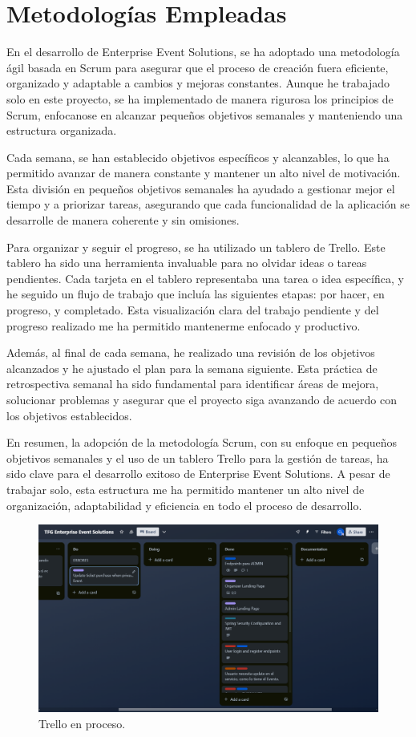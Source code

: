 \section{Metodologías Empleadas}

En el desarrollo de Enterprise Event Solutions, se ha adoptado una metodología ágil basada en Scrum para asegurar que el proceso de creación 
fuera eficiente, organizado y adaptable a cambios y mejoras constantes. Aunque he trabajado solo en este proyecto, se ha implementado de manera 
rigurosa los principios de Scrum, enfocanose en alcanzar pequeños objetivos semanales y manteniendo una estructura organizada.

Cada semana, se han establecido objetivos específicos y alcanzables, lo que ha permitido avanzar de manera constante y mantener un alto nivel 
de motivación. Esta división en pequeños objetivos semanales ha ayudado a gestionar mejor el tiempo y a priorizar tareas, asegurando que cada 
funcionalidad de la aplicación se desarrolle de manera coherente y sin omisiones.

Para organizar y seguir el progreso, se ha utilizado un tablero de Trello. Este tablero ha sido una herramienta invaluable para no olvidar ideas o 
tareas pendientes. Cada tarjeta en el tablero representaba una tarea o idea específica, y he seguido un flujo de trabajo que incluía las siguientes 
etapas: por hacer, en progreso, y completado. Esta visualización clara del trabajo pendiente y del progreso realizado me ha permitido mantenerme 
enfocado y productivo.

Además, al final de cada semana, he realizado una revisión de los objetivos alcanzados y he ajustado el plan para la semana siguiente. Esta práctica 
de retrospectiva semanal ha sido fundamental para identificar áreas de mejora, solucionar problemas y asegurar que el proyecto siga avanzando de acuerdo 
con los objetivos establecidos.

En resumen, la adopción de la metodología Scrum, con su enfoque en pequeños objetivos semanales y el uso de un tablero Trello para la gestión de 
tareas, ha sido clave para el desarrollo exitoso de Enterprise Event Solutions. A pesar de trabajar solo, esta estructura me ha permitido mantener 
un alto nivel de organización, adaptabilidad y eficiencia en todo el proceso de desarrollo.


\begin{figure}[h]
    \includegraphics[width=\linewidth]{Trello.png}
    \caption{Trello en proceso.}
    \label{fig:metodologias1}
\end{figure}

